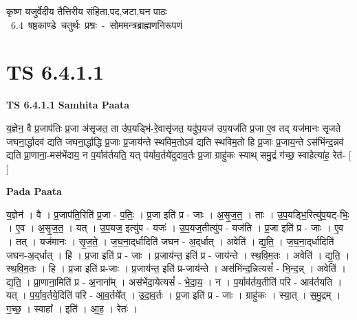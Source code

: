 \documentclass[17pt]{extarticle}
\begin{document}
\begin{titlepage}
    \begin{center}
 
\begin{sanskrit}
    { \Large
    कृष्ण यजुर्वेदीय तैत्तिरीय संहिता,पद,जटा,घन पाठः 
    }
    \\
    \vspace{2.5cm}
    \mbox{ \Large
    6.4       षष्ठकाण्डे चतुर्थः प्रश्नः - सोममन्त्रब्राह्मणनिरूपणं   }
\end{sanskrit}
\end{center}

\end{titlepage}
\tableofcontents
{}
\pagebreak


\section{ TS 6.4.1.1 }

\textbf{TS 6.4.1.1 } \newline
\textbf{Samhita Paata} \newline

य॒ज्ञेन॒ वै प्र॒जाप॑तिः प्र॒जा अ॑सृजत॒ ता उ॑प॒यड्भि॑-रे॒वासृ॑जत॒ यदु॑प॒यज॑ उप॒यज॑ति प्र॒जा ए॒व तद् यज॑मानः सृजते जघना॒र्द्धादव॑ द्यति जघना॒र्द्धाद्धि प्र॒जाः प्र॒जाय॑न्ते स्थविम॒तोऽव॑ द्यति स्थविम॒तो हि प्र॒जाः प्र॒जाय॒न्ते ऽस॑भिंन्द॒न्नव॑ द्यति प्रा॒णाना॒-मस॑भेंदाय॒ न प॒र्याव॑र्तयति॒ यत् प॑र्याव॒र्तये॑दुदाव॒र्तः प्र॒जा ग्राहु॑कः स्याथ् समु॒द्रं ग॑च्छ॒ स्वाहेत्या॑ह॒ रेत॑- [  ] \newline

\textbf{Pada Paata} \newline

य॒ज्ञेन॑ । वै । प्र॒जाप॑ति॒रिति॑ प्र॒जा - प॒तिः॒ । प्र॒जा इति॑ प्र - जाः । अ॒सृ॒ज॒त॒ । ताः । उ॒प॒यड्भि॒रित्यु॑प॒यट्-भिः॒ । ए॒व । अ॒सृ॒ज॒त॒ । यत् । उ॒प॒यज॒ इत्यु॑प - यजः॑ । उ॒प॒यज॒तीत्यु॑प - यज॑ति । प्र॒जा इति॑ प्र - जाः । ए॒व । तत् । यज॑मानः । सृ॒ज॒ते॒ । ज॒घ॒ना॒द्‌र्धादिति॑ जघन - अ॒द्‌र्धात् । अवेति॑ । द्य॒ति॒ । ज॒घ॒ना॒द्‌र्धादिति॑ जघन-अ॒द्‌र्धात् । हि । प्र॒जा इति॑ प्र - जाः । प्र॒जाय॑न्त॒ इति॑ प्र - जाय॑न्ते । स्थ॒वि॒म॒तः । अवेति॑ । द्य॒ति॒ । स्थ॒वि॒म॒तः । हि । प्र॒जा इति॑ प्र-जाः । प्र॒जाय॑न्त॒ इति॑ प्र-जाय॑न्ते । अस॑भिंन्द॒न्नित्यसं᳚ - भि॒न्द॒न्न् । अवेति॑ । द्य॒ति॒ । प्रा॒णाना॒मिति॑ प्र - अ॒नाना᳚म् । अस॑भेंदा॒येत्यसं᳚ - भे॒दा॒य॒ । न । प॒र्याव॑र्तय॒तीति॑ परि - आव॑र्तयति । यत् । प॒र्या॒व॒र्तये॒दिति॑ परि - आ॒व॒र्तये᳚त् । उ॒दा॒व॒र्तः । प्र॒जा इति॑ प्र - जाः । ग्राहु॑कः । स्या॒त् । स॒मु॒द्रम् । ग॒च्छ॒ । स्वाहा᳚ । इति॑ । आ॒ह॒ । रेतः॑ ।  \newline
\end{document}
